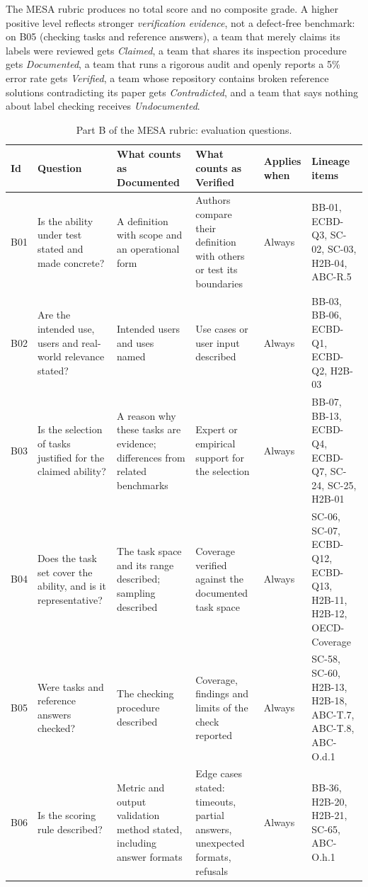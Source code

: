 \documentclass[10pt,conference]{IEEEtran}
\begin{document}
The MESA rubric produces no total score and no composite grade. A higher positive level reflects stronger \emph{verification evidence}, not a defect-free benchmark: on B05 (checking tasks and reference answers), a team that merely claims its labels were reviewed gets \emph{Claimed}, a team that shares its inspection procedure gets \emph{Documented}, a team that runs a rigorous audit and openly reports a 5\% error rate gets \emph{Verified}, a team whose repository contains broken reference solutions contradicting its paper gets \emph{Contradicted}, and a team that says nothing about label checking receives \emph{Undocumented}.

\begin{table}[t]
\caption{Part B of the MESA rubric: evaluation questions.}
\label{tab:rubric-b}
\centering
\scriptsize
\setlength{\tabcolsep}{3.5pt}
\begin{tabularx}{\textwidth}{@{}lXXXXl@{}}
\toprule
\textbf{Id} & \textbf{Question} & \textbf{What counts as Documented} & \textbf{What counts as Verified} & \textbf{Applies when} & \textbf{Lineage items} \\
\midrule
B01 & Is the ability under test stated and made concrete? & A definition with scope and an operational form & Authors compare their definition with others or test its boundaries & Always & BB-01, ECBD-Q3, SC-02, SC-03, H2B-04, ABC-R.5 \\
B02 & Are the intended use, users and real-world relevance stated? & Intended users and uses named & Use cases or user input described & Always & BB-03, BB-06, ECBD-Q1, ECBD-Q2, H2B-03 \\
B03 & Is the selection of tasks justified for the claimed ability? & A reason why these tasks are evidence; differences from related benchmarks & Expert or empirical support for the selection & Always & BB-07, BB-13, ECBD-Q4, ECBD-Q7, SC-24, SC-25, H2B-01 \\
B04 & Does the task set cover the ability, and is it representative? & The task space and its range described; sampling described & Coverage verified against the documented task space & Always & SC-06, SC-07, ECBD-Q12, ECBD-Q13, H2B-11, H2B-12, OECD-Coverage \\
B05 & Were tasks and reference answers checked? & The checking procedure described & Coverage, findings and limits of the check reported & Always & SC-58, SC-60, H2B-13, H2B-18, ABC-T.7, ABC-T.8, ABC-O.d.1 \\
B06 & Is the scoring rule described? & Metric and output validation method stated, including answer formats & Edge cases stated: timeouts, partial answers, unexpected formats, refusals & Always & BB-36, H2B-20, H2B-21, SC-65, ABC-O.h.1 \\

\end{tabularx}
\end{table}
\end{document}
